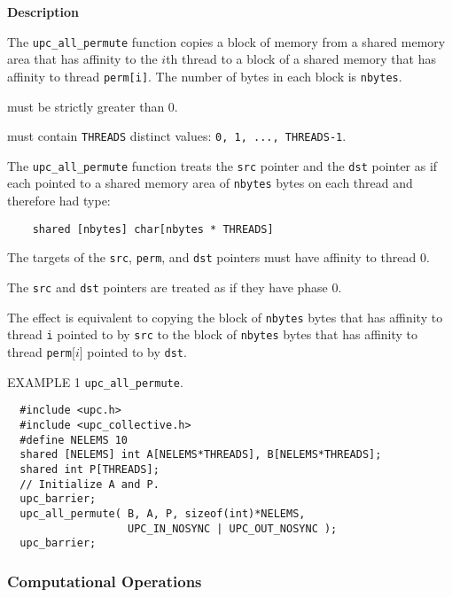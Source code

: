 {\bf Description} 

\np The {\tt upc\_all\_permute} function copies a block of memory from a
shared memory area that has affinity to the $i$th thread to a block of a
shared memory that has affinity to thread {\tt perm[i]}.
The number of bytes in each block is {\tt nbytes}.

 must be strictly greater than 0.

 must contain {\tt THREADS} distinct
values: {\tt 0, 1, ...,  THREADS-1}.

\np The {\tt upc\_all\_permute} function treats the {\tt src} pointer
and the {\tt dst} pointer as if each pointed to a shared memory
area of {\tt nbytes} bytes on each thread and therefore had type:

\begin{verbatim}
    shared [nbytes] char[nbytes * THREADS]
\end{verbatim}  

\np The targets of the {\tt src}, {\tt perm}, and
{\tt dst} pointers must have affinity to thread 0.

\np The {\tt src} and {\tt dst} pointers are treated as
if they have phase 0.

\np The effect is equivalent to copying the block of {\tt nbytes} bytes
that has affinity to thread {\tt i} pointed to by {\tt src}
to the block of {\tt nbytes} bytes
that has affinity to thread {\tt perm}[$i$] pointed to by {\tt dst}.

\np EXAMPLE 1 {\tt upc\_all\_permute}.
\begin{verbatim}
  #include <upc.h>
  #include <upc_collective.h>
  #define NELEMS 10
  shared [NELEMS] int A[NELEMS*THREADS], B[NELEMS*THREADS];
  shared int P[THREADS];
  // Initialize A and P.
  upc_barrier;
  upc_all_permute( B, A, P, sizeof(int)*NELEMS,
                   UPC_IN_NOSYNC | UPC_OUT_NOSYNC );
  upc_barrier;
\end{verbatim}

\subsubsection{Computational Operations}
\label{upc-op-t-section}

